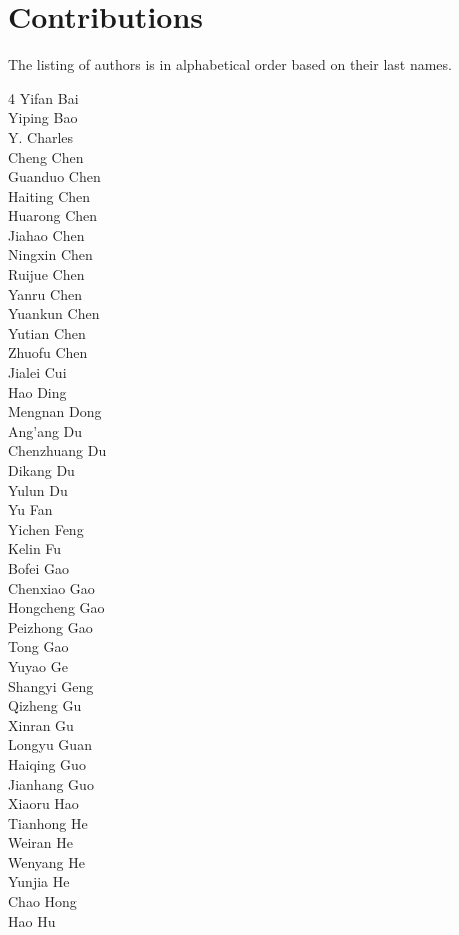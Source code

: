 \section{Contributions}
The listing of authors is in alphabetical order based on their last names. 
\begin{multicols}{4}
Yifan Bai\\
Yiping Bao\\
Y. Charles\\
Cheng Chen\\
Guanduo Chen\\
Haiting Chen\\
Huarong Chen\\
Jiahao Chen\\
Ningxin Chen\\
Ruijue Chen\\
Yanru Chen\\
Yuankun Chen\\
Yutian Chen\\
Zhuofu Chen\\
Jialei Cui\\
Hao Ding\\
Mengnan Dong\\
Ang'ang Du\\
Chenzhuang Du\\
Dikang Du\\
Yulun Du\\
Yu Fan\\
Yichen Feng\\
Kelin Fu\\
Bofei Gao\\
Chenxiao Gao\\
Hongcheng Gao\\
Peizhong Gao\\
Tong Gao\\
Yuyao Ge\\
Shangyi Geng\\
Qizheng Gu\\
Xinran Gu\\
Longyu Guan\\
Haiqing Guo\\
Jianhang Guo\\
Xiaoru Hao\\
Tianhong He\\
Weiran He\\
Wenyang He\\
Yunjia He\\
Chao Hong\\
Hao Hu\\

\end{multicols}
